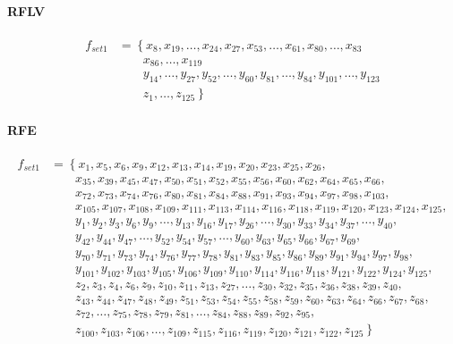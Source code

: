 \documentclass[USenglish]{ifimaster}  %
\begin{document}
\paragraph{RFLV}
\begin{align}
f_{set1} &= \left\{x_{8}, x_{19},\dotsc, x_{24}, x_{27},  x_{53}, \dotsc, x_{61}, x_{80}, \dotsc, x_{83}\right.\nonumber\\
&\qquad \left.{}  x_{86},\dotsc,x_{119} \right.\nonumber\\
&\qquad \left.{}  y_{14},\dotsc,  y_{27}, y_{52}, \dotsc, y_{60}, y_{81},\dotsc, y_{84}, y_{101}, \dotsc, y_{123} \right.\nonumber\\
&\qquad \left.{} z_{1},\dotsc,z_{125} \right\}
\end{align}


\paragraph{RFE} 
\begin{align}
f_{set1} &= \left\{x_{1}, x_{5}, x_{6}, x_{9}, x_{12}, x_{13}, x_{14}, x_{19},x_{20},x_{23},x_{25},x_{26},  \right.\nonumber\\
&\qquad \left.{}  x_{35}, x_{39},x_{45},x_{47},x_{50},x_{51},x_{52},x_{55},x_{56},x_{60},x_{62},x_{64},x_{65},x_{66}, \right.\nonumber\\
&\qquad \left.{}  x_{72},x_{73},x_{74},x_{76},x_{80},x_{81},x_{84},x_{88},x_{91},x_{93},x_{94},x_{97},x_{98},x_{103}, \right.\nonumber\\
&\qquad \left.{}  x_{105},x_{107},x_{108},x_{109},x_{111},x_{113},x_{114},x_{116},x_{118},x_{119},x_{120},x_{123},x_{124},x_{125}, \right.\nonumber\\
&\qquad \left.{}  y_{1},y_{2},y_{3},y_{6},y_{9},\dotsc,y_{13},y_{16}, y_{17},y_{26},\dotsc,y_{30},y_{33}, y_{34},y_{37},\dotsc,y_{40}, \right.\nonumber\\
&\qquad \left.{}  y_{42}, y_{44}, y_{47},\dotsc, y_{52}, y_{54}, y_{57},\dotsc, y_{60}, y_{63}, y_{65}, y_{66}, y_{67}, y_{69}, \right.\nonumber\\
&\qquad \left.{}  y_{70}, y_{71}, y_{73}, y_{74}, y_{76}, y_{77}, y_{78}, y_{81}, y_{83}, y_{85}, y_{86}, y_{89}, y_{91}, y_{94}, y_{97}, y_{98}, \right.\nonumber\\
&\qquad \left.{}  y_{101}, y_{102}, y_{103}, y_{105}, y_{106}, y_{109}, y_{110}, y_{114}, y_{116}, y_{118}, y_{121}, y_{122}, y_{124}, y_{125}, \right.\nonumber\\
&\qquad \left.{}  z_{2}, z_{3}, z_{4}, z_{6}, z_{9}, z_{10}, z_{11}, z_{13},z_{27},\dotsc,z_{30},z_{32}, z_{35}, z_{36}, z_{38}, z_{39}, z_{40}, \right.\nonumber\\
&\qquad \left.{}  z_{43}, z_{44}, z_{47}, z_{48}, z_{49}, z_{51}, z_{53}, z_{54}, z_{55}, z_{58}, z_{59}, z_{60}, z_{63}, z_{64}, z_{66}, z_{67}, z_{68}, \right.\nonumber\\
&\qquad \left.{}  z_{72},\dotsc , z_{75}, z_{78}, z_{79}, z_{81},\dotsc, z_{84}, z_{88}, z_{89}, z_{92}, z_{95}, \right.\nonumber\\
&\qquad \left.{} z_{100}, z_{103}, z_{106},\dotsc ,z_{109}, z_{115}, z_{116}, z_{119}, z_{120}, z_{121}, z_{122}, z_{125}\right\}
\end{align}
\end{document}
